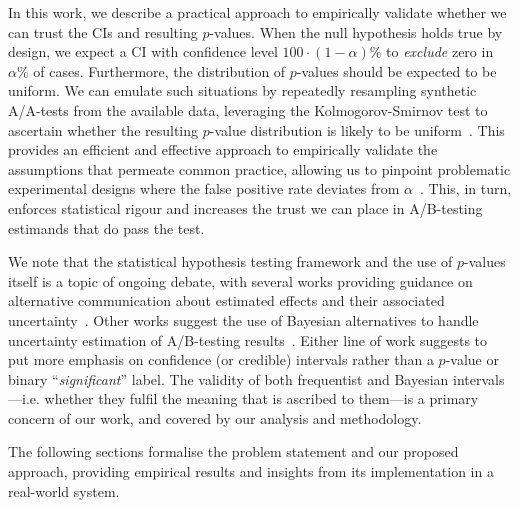 In this work, we describe a practical approach to empirically validate whether we can trust the CIs and resulting $p$-values.
When the null hypothesis holds true by design, we expect a CI with confidence level $100\cdot(1-\alpha)\%$ to \emph{exclude} zero in $\alpha\%$ of cases.
Furthermore, the distribution of $p$-values should be expected to be uniform.
We can emulate such situations by repeatedly resampling synthetic A/A-tests from the available data, leveraging the Kolmogorov-Smirnov test to ascertain whether the resulting $p$-value distribution is likely to be uniform~\cite[p.~188]{kohavi2020trustworthy}.
This provides an efficient and effective approach to empirically validate the assumptions that permeate common practice, allowing us to pinpoint problematic experimental designs where the false positive rate deviates from $\alpha$~\cite{Kohavi2024}.
This, in turn, enforces statistical rigour and increases the trust we can place in A/B-testing estimands that do pass the test.

We note that the statistical hypothesis testing framework and the use of $p$-values itself is a topic of ongoing debate, with several works providing guidance on alternative communication about estimated effects and their associated uncertainty~\cite{Wasserstein2019,McShane2019}.
Other works suggest the use of Bayesian alternatives to handle uncertainty estimation of A/B-testing results~\cite{Deng2015,Gronau2021}.
Either line of work suggests to put more emphasis on confidence (or credible) intervals rather than a $p$-value or binary ``\emph{significant}'' label.
The validity of both frequentist and Bayesian intervals---i.e. whether they fulfil the meaning that is ascribed to them---is a primary concern of our work, and covered by our analysis and methodology.

The following sections formalise the problem statement and our proposed approach, providing empirical results and insights from its implementation in a real-world system.